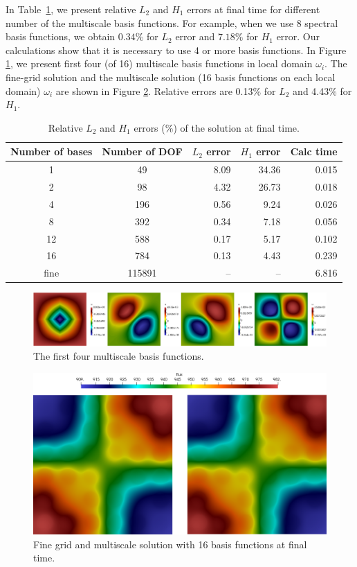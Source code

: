 \documentclass[10pt]{article}
\begin{document}
In Table~\ref{t2}, we present relative $L_2$ and $H_1$ errors at final time for different number of the multiscale basis functions.
For example, when we use 8 spectral basis functions, we obtain $0.34\%$ for $L_2$ error and $7.18\%$ for $H_1$ error. 
Our calculations show that it is necessary to use 4 or more basis functions. 
In Figure \ref{p7}, we present first four (of 16) multiscale basis functions in local domain $\omega_i$.
The fine-grid solution and the multiscale solution (16 basis functions on each local domain) $\omega_i$ are shown in Figure \ref{p6}. Relative errors are 0.13\% for $L_2$ and 4.43\% for $H_1$. 

\begin{table}[h!]
\caption{Relative $L_2$ and $H_1$ errors ($\%$) of the solution at final time.}
\label{t2}
\begin{center}
\begin{tabular}{|c|c|r|r|r|}
\hline
Number of bases & Number of DOF & $L_2$ error & $H_1$ error & Calc time\\
\hline
1 & 49 & 8.09 & 34.36 & 0.015 \\
2 & 98 & 4.32 & 26.73 & 0.018 \\
4 & 196 & 0.56 & 9.24 & 0.026 \\
8 & 392 & 0.34 & 7.18 & 0.056 \\
12 & 588 & 0.17 & 5.17 & 0.102 \\
16 & 784 & 0.13 & 4.43 & 0.239 \\
fine & 115891 & -- & -- & 6.816 \\
\hline
\end{tabular}
\end{center}
\end{table}

\begin{figure}[h!]
\centering
\includegraphics[width=0.95\linewidth]{basis.png} 
\caption{The first four multiscale basis functions.}
\label{p7}
\end{figure} 

\begin{figure}[h!]
\centering
\includegraphics[width=0.75\linewidth]{flux.png} 
\caption{Fine grid and multiscale solution with 16 basis functions at final time.}
\label{p6}
\end{figure} 
\end{document}
